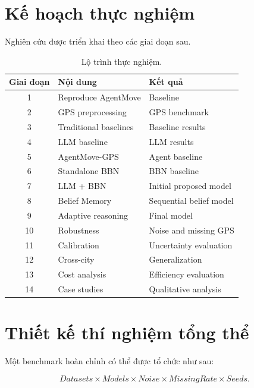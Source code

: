 \documentclass[11pt,a4paper]{article}
\begin{document}
	\section{Kế hoạch thực nghiệm}
	
	Nghiên cứu được triển khai theo các giai đoạn sau.
	
	\begin{table}[H]
		\centering
		\caption{Lộ trình thực nghiệm.}
		\label{tab:roadmap}
		
		\begin{tabular}{cll}
			\toprule
			Giai đoạn & Nội dung & Kết quả \\
			\midrule
			1 & Reproduce AgentMove & Baseline \\
			2 & GPS preprocessing & GPS benchmark \\
			3 & Traditional baselines & Baseline results \\
			4 & LLM baseline & LLM results \\
			5 & AgentMove-GPS & Agent baseline \\
			6 & Standalone BBN & BBN baseline \\
			7 & LLM + BBN & Initial proposed model \\
			8 & Belief Memory & Sequential belief model \\
			9 & Adaptive reasoning & Final model \\
			10 & Robustness & Noise and missing GPS \\
			11 & Calibration & Uncertainty evaluation \\
			12 & Cross-city & Generalization \\
			13 & Cost analysis & Efficiency evaluation \\
			14 & Case studies & Qualitative analysis \\
			\bottomrule
		\end{tabular}
		
	\end{table}
	
	\section{Thiết kế thí nghiệm tổng thể}
	
	Một benchmark hoàn chỉnh có thể được tổ chức như sau:
	
	\begin{equation}
		Datasets
		\times
		Models
		\times
		Noise
		\times
		MissingRate
		\times
		Seeds.
	\end{equation}
	
\end{document}
